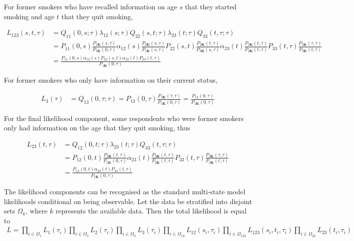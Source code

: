 \documentclass[11pt,a4paper]{article}
\newcommand{\K}{\ensuremath{\bm{K}}}
\begin{document}
For former smokers who have recalled information on age $s$ that they started smoking and age $t$ that they quit smoking,

\begin{align*}
L_{123}(s,t,\tau) & = Q_{11}(0,s;\tau) \lambda_{12}(s;\tau) Q_{22}(s,t;\tau) \lambda_{23}(t;\tau) Q_{33}(t,\tau;\tau) \\
& = P_{11}(0,s)\frac{P_{1\K}(s,\tau)}{P_{1\K}(0,\tau)} 
\alpha_{12}(s) \frac{P_{2\K}(s,\tau)}{P_{1\K}(s,\tau)}
P_{22}(s,t)\frac{P_{2\K}(t,\tau)}{P_{2\K}(s,\tau)}
\alpha_{23}(t) \frac{P_{3\K}(t,\tau)}{P_{2\K}(t,\tau)}
P_{33}(t,\tau)\frac{P_{3\K}(\tau,\tau)}{P_{3\K}(t,\tau)} \\
& = \frac{P_{11}(0,s) \alpha_{12}(s) P_{22}(s,t) \alpha_{23}(t) P_{33}(t,\tau)}{P_{1\K}(0,\tau)}
\end{align*}

For former smokers who only have information on their current status, 

\begin{align*}
L_3(\tau) & = Q_{13}(0,\tau;\tau)  = P_{13}(0,\tau)\frac{P_{3\K}(\tau,\tau)}{P_{1\K}(0,\tau)} 
= \frac{P_{13}(0,\tau)}{P_{1\K}(0,\tau)}  
\end{align*}

For the final likelihood component, some respondents who were former smokers only had information on the age that they quit smoking, thus
 
\begin{align*}
L_{23}(t,\tau) & = Q_{12}(0,t;\tau) \lambda_{23}(t;\tau) Q_{33}(t,\tau;\tau) \\
& = P_{12}(0,t)\frac{P_{2\K}(t,\tau)}{P_{1\K}(0,\tau)} 
\alpha_{23}(t) \frac{P_{3\K}(t,\tau)}{P_{2\K}(t,\tau)}
P_{33}(t,\tau)\frac{P_{3\K}(\tau,\tau)}{P_{3\K}(t,\tau)} \\
& = \frac{P_{12}(0,t) \alpha_{23}(t) P_{33}(t,\tau)}{P_{1\K}(0,\tau)}
\end{align*}

The likelihood components can be recognised as the standard
multi-state model likelihoods conditional on being observable.  Let the data
be stratified into disjoint sets $\Omega_k$, where $k$ represents the
available data. Then the total likelihood is equal to
\begin{align*}
  L = 
\prod_{i \in \Omega_1} L_1(\tau_i)  
\prod_{i \in \Omega_2} L_2(\tau_i)  
\prod_{i \in \Omega_3} L_3(\tau_i)  
\prod_{i \in \Omega_{12}} L_{12}(s_i,\tau_i)  
\prod_{i \in \Omega_{123}} L_{123}(s_i,t_i,\tau_i)  
\prod_{i \in \Omega_{23}} L_{23}(t_i,\tau_i)  
\end{align*}
\end{document}
